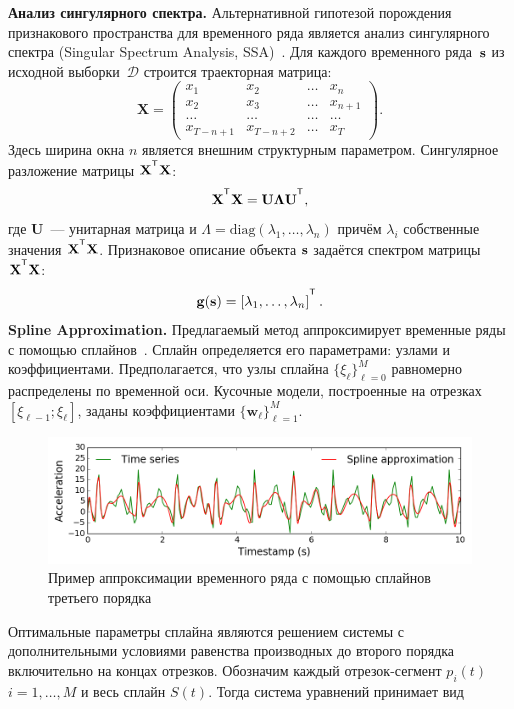 \textbf{Анализ сингулярного спектра.}
Альтернативной гипотезой порождения признакового пространства для временного ряда является анализ сингулярного спектра (Singular Spectrum Analysis, SSA)~\cite{hassani2007singular}. 
Для каждого временного ряда~$\mathbf{s}$ из исходной выборки~$\mathcal{D}$ строится траекторная матрица:
\[
	\mathbf{X} = 
	\begin{pmatrix}
		x_1 & x_2 & \dots & x_n \\
		x_2 & x_3 & \dots & x_{n+1} \\
		\dots & \dots & \dots & \dots \\
		x_{T-n+1} & x_{T-n+2} & \dots & x_T
	\end{pmatrix}.
\]
Здесь ширина окна $n$ является внешним структурным параметром.
Сингулярное разложение матрицы $\mathbf{X}^{\T} \mathbf{X}$:
\[
	\mathbf{X}^{\T} \mathbf{X} = \mathbf{U} \mathbf{\Lambda} \mathbf{U}^{\T},
\]
где $\mathbf{U}$~--- унитарная матрица и $\Lambda = \mathrm{diag}(\lambda_1, \dots, \lambda_n)$ причём $\lambda_i$ собственные значения $\mathbf{X}^{\T} \mathbf{X}$. 
Признаковое описание объекта $\mathbf{s}$ задаётся спектром матрицы $\mathbf{X}^{\T} \mathbf{X}$:
\[
	\mathbf{g}(\bs) = \left[\lambda_1, \dots, \lambda_n\right]^{\T}.
\]
\textbf{Spline Approximation.}
Предлагаемый метод аппроксимирует временные ряды с помощью сплайнов~\cite{deboor1978splines}. Сплайн определяется его параметрами: узлами и коэффициентами.
Предполагается, что узлы сплайна $\{\xi_\ell\}_{\ell=0}^M$ равномерно распределены по временной оси.
Кусочные модели, построенные на отрезках $[\xi_{\ell-1}; \xi_{\ell}]$, заданы коэффициентами $\{\mathbf{w}_\ell\}_{\ell=1}^{M}$.
\begin{figure}[h]
	\centering
	\includegraphics[width=1\linewidth]{figs/ch6/spline_example.png}
	\caption{Пример аппроксимации временного ряда с помощью сплайнов третьего порядка}
	\label{ch6:fig:spline_example}
\end{figure}
Оптимальные параметры сплайна являются решением системы с дополнительными условиями равенства производных до второго порядка включительно на концах отрезков.
Обозначим каждый отрезок-сегмент $p_i(t)$ $i = 1, \dots, M$ и весь сплайн $S(t)$. Тогда система уравнений принимает вид
